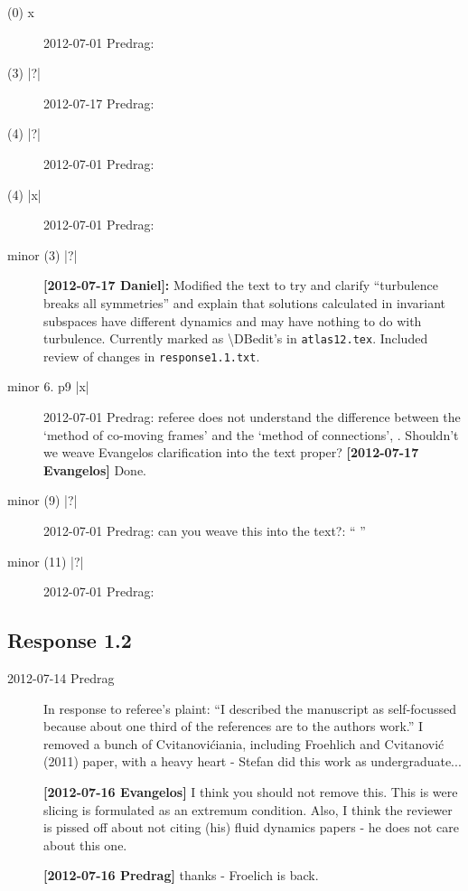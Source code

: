 \begin{description}
\item[(0)  x ] 2012-07-01 Predrag:

\item[(3) |?|] 2012-07-17 Predrag:

\item[(4) |?|] 2012-07-01 Predrag:

\item[(4) |x|] 2012-07-01 Predrag:

\item[minor (3) |?|] {\bf [2012-07-17 Daniel]:} Modified the text to try and clarify ``turbulence breaks all symmetries'' and explain that solutions calculated in invariant subspaces have different dynamics and may have nothing to do with turbulence. Currently marked as \textbackslash DBedit's in \texttt{atlas12.tex}. Included review of changes in \texttt{response1.1.txt}.

\item[minor 6. p9 |x|] 2012-07-01 Predrag:
 referee does not understand the difference between the `method of
 co-moving frames' and the `method of connections',
 . Shouldn't we weave Evangelos clarification
 into the text proper? {\bf [2012-07-17 Evangelos]} Done.

\item[minor (9) |?|] 2012-07-01 Predrag: can you weave this into the text?: ``
''

\item[minor (11) |?|] 2012-07-01 Predrag:

\end{description}

\subsection{Response 1.2}
\label{sect:Response1.2}

\begin{description}

\item[2012-07-14 Predrag] In response to referee's plaint:
``I described the manuscript as self-focussed because about one third of
the references are to the authors work.'' I removed a bunch of
Cvitanovi\'ciania, including Froehlich and Cvitanovi\'c (2011) paper, with
a heavy heart - Stefan did this work as undergraduate...

{\bf [2012-07-16 Evangelos]} I think you should not remove this. This is were
		slicing is formulated as an extremum condition. Also,
		I think the reviewer is pissed off about not citing (his)
		fluid dynamics papers - he does not care about this one.

{\bf [2012-07-16 Predrag]} thanks - Froelich is back.


\end{description}
